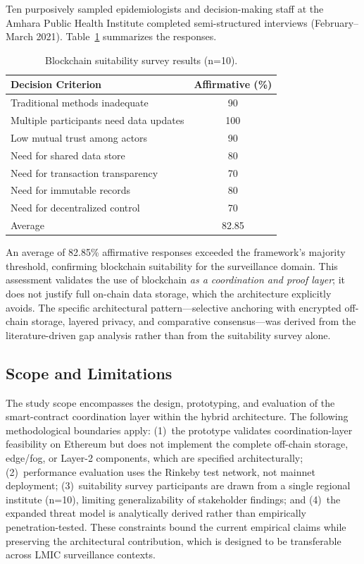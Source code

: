 \documentclass[AMA,LATO1COL]{WileyNJD-v2}
\begin{document}
Ten purposively sampled epidemiologists and decision-making staff at the Amhara Public Health Institute completed semi-structured interviews (February--March 2021). Table~\ref{tab:survey} summarizes the responses.

\begin{table}[!ht]
\caption{Blockchain suitability survey results (n=10).}\label{tab:survey}
\begin{tabular*}{\columnwidth}{@{\extracolsep\fill}lc@{}}
\toprule
Decision Criterion & Affirmative (\%) \\
\midrule
Traditional methods inadequate & 90 \\
Multiple participants need data updates & 100 \\
Low mutual trust among actors & 90 \\
Need for shared data store & 80 \\
Need for transaction transparency & 70 \\
Need for immutable records & 80 \\
Need for decentralized control & 70 \\
\midrule
Average & 82.85 \\
\bottomrule
\end{tabular*}
\end{table}

An average of 82.85\% affirmative responses exceeded the framework's majority threshold, confirming blockchain suitability for the surveillance domain. This assessment validates the use of blockchain \emph{as a coordination and proof layer}; it does not justify full on-chain data storage, which the architecture explicitly avoids. The specific architectural pattern---selective anchoring with encrypted off-chain storage, layered privacy, and comparative consensus---was derived from the literature-driven gap analysis rather than from the suitability survey alone.

\subsection{Scope and Limitations}\label{subsec:scope}

The study scope encompasses the design, prototyping, and evaluation of the smart-contract coordination layer within the hybrid architecture. The following methodological boundaries apply: (1)~the prototype validates coordination-layer feasibility on Ethereum but does not implement the complete off-chain storage, edge/fog, or Layer-2 components, which are specified architecturally; (2)~performance evaluation uses the Rinkeby test network, not mainnet deployment; (3)~suitability survey participants are drawn from a single regional institute (n=10), limiting generalizability of stakeholder findings; and (4)~the expanded threat model is analytically derived rather than empirically penetration-tested. These constraints bound the current empirical claims while preserving the architectural contribution, which is designed to be transferable across LMIC surveillance contexts.
\end{document}
